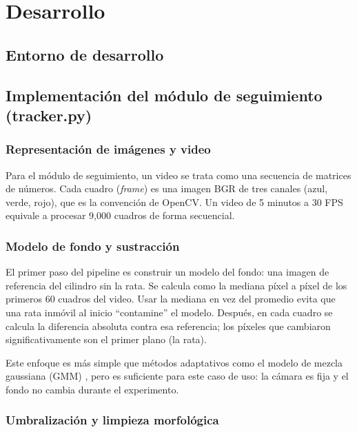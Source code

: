 \chapter{Desarrollo}

\section{Entorno de desarrollo}

\section{Implementaci\'{o}n del m\'{o}dulo de seguimiento (tracker.py)}

\subsection{Representación de imágenes y video}

Para el módulo de seguimiento, un video se trata como una secuencia de matrices de
números. Cada cuadro (\textit{frame}) es una imagen BGR de tres canales (azul, verde,
rojo), que es la convención de OpenCV. Un video de 5 minutos a 30 FPS equivale a
procesar 9{,}000 cuadros de forma secuencial.

\subsection{Modelo de fondo y sustracción}

El primer paso del pipeline es construir un modelo del fondo: una imagen de referencia
del cilindro sin la rata. Se calcula como la mediana píxel a píxel de los primeros
60 cuadros del video. Usar la mediana en vez del promedio evita que una rata inmóvil
al inicio ``contamine'' el modelo. Después, en cada cuadro se calcula la diferencia
absoluta contra esa referencia; los píxeles que cambiaron significativamente son el
primer plano (la rata).

Este enfoque es más simple que métodos adaptativos como el modelo de mezcla gaussiana
(GMM) \cite{zivkovic2004}, pero es suficiente para este caso de uso: la cámara es fija
y el fondo no cambia durante el experimento.

\subsection{Umbralización y limpieza morfológica}

